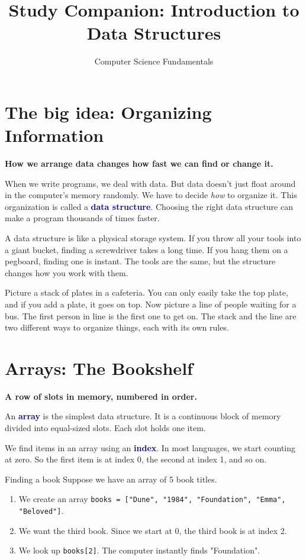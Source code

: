 \documentclass[11pt,a4paper]{article}
\newcommand{\secsub}[1]{\noindent\textbf{#1}\par\medskip}
\newcommand{\vocab}[1]{\textbf{\textcolor{navy}{#1}}}
\newenvironment{steps}{\begin{enumerate}[label=\textbf{Step \arabic*.},leftmargin=*]}{\end{enumerate}}
\begin{document}
\title{Study Companion: Introduction to Data Structures}
\author{Computer Science Fundamentals}
\date{}
\maketitle

\section{The big idea: Organizing Information}
\secsub{How we arrange data changes how fast we can find or change it.}

When we write programs, we deal with data. But data doesn't just float around in the computer's memory randomly. We have to decide \emph{how} to organize it. This organization is called a \vocab{data structure}. Choosing the right data structure can make a program thousands of times faster.

\begin{intuition}
A data structure is like a physical storage system. If you throw all your tools into a giant bucket, finding a screwdriver takes a long time. If you hang them on a pegboard, finding one is instant. The tools are the same, but the structure changes how you work with them.
\end{intuition}

\begin{everyday}
Picture a stack of plates in a cafeteria. You can only easily take the top plate, and if you add a plate, it goes on top. Now picture a line of people waiting for a bus. The first person in line is the first one to get on. The stack and the line are two different ways to organize things, each with its own rules.
\end{everyday}

\section{Arrays: The Bookshelf}
\secsub{A row of slots in memory, numbered in order.}

An \vocab{array} is the simplest data structure. It is a continuous block of memory divided into equal-sized slots. Each slot holds one item.

We find items in an array using an \vocab{index}. In most languages, we start counting at zero. So the first item is at index 0, the second at index 1, and so on.

\begin{worked}{Finding a book}
Suppose we have an array of 5 book titles.
\begin{steps}
  \item We create an array \texttt{books = ["Dune", "1984", "Foundation", "Emma", "Beloved"]}.
  \item We want the third book. Since we start at 0, the third book is at index 2.
  \item We look up \texttt{books[2]}. The computer instantly finds "Foundation".
\end{steps}
\end{worked}
\end{document}
